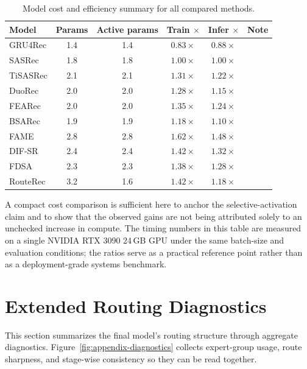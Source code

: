 \documentclass[sigconf,review,anonymous]{acmart}
\begin{document}
\begin{table}[H]
  \centering
  \caption{Model cost and efficiency summary for all compared methods.}
  \label{tab:appendix-efficiency}
  \scriptsize
  \setlength{\tabcolsep}{3pt}
  \renewcommand{\arraystretch}{1.05}
  \begin{tabularx}{\columnwidth}{@{}L{0.19\columnwidth}ccccL{0.32\columnwidth}@{}}
    \toprule
    Model & Params & Active params & Train $\times$ & Infer $\times$ & Note \\
    \midrule
    GRU4Rec & 1.4 & 1.4 & $0.83\times$ & $0.88\times$ &  \\
    SASRec & 1.8 & 1.8 & $1.00\times$ & $1.00\times$ &  \\
    TiSASRec & 2.1 & 2.1 & $1.31\times$ & $1.22\times$ &  \\
    DuoRec & 2.0 & 2.0 & $1.28\times$ & $1.15\times$ &  \\
    FEARec & 2.0 & 2.0 & $1.35\times$ & $1.24\times$ &  \\
    BSARec & 1.9 & 1.9 & $1.18\times$ & $1.10\times$ &  \\
    FAME & 2.8 & 2.8 & $1.62\times$ & $1.48\times$ &  \\
    DIF-SR & 2.4 & 2.4 & $1.42\times$ & $1.32\times$ &  \\
    FDSA & 2.3 & 2.3 & $1.38\times$ & $1.28\times$ &  \\
    RouteRec & 3.2 & 1.6 & $1.42\times$ & $1.18\times$ &  \\
    \bottomrule
  \end{tabularx}
\end{table}

A compact cost comparison is sufficient here to anchor the selective-activation claim and to show that the observed gains are not being attributed solely to an unchecked increase in compute. The timing numbers in this table are measured on a single NVIDIA RTX 3090 24\,GB GPU under the same batch-size and evaluation conditions; the ratios serve as a practical reference point rather than as a deployment-grade systems benchmark.

\section{Extended Routing Diagnostics}
\label{app:diagnostics}
This section summarizes the final model's routing structure through aggregate diagnostics. Figure~\ref{fig:appendix-diagnostics} collects expert-group usage, route sharpness, and stage-wise consistency so they can be read together.
\end{document}
